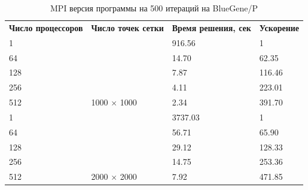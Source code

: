 \documentclass[12pt, a4paper]{article}
\begin{document}
        \begin{table}[H]
            \centering
            \caption{MPI версия программы на 500 итераций на BlueGene/P}
            \label{tab:bg_mpi500}
            \begin{tabular}{llll}
            \rowcolor[HTML]{C0C0C0}
            \textbf{Число процессоров} & \textbf{Число точек сетки}                   & \textbf{Время решения, сек} & \textbf{Ускорение} \\
            \rowcolor[HTML]{EFEFEF}
            1                          & \multicolumn{1}{c}{\cellcolor[HTML]{EFEFEF}} & 916.56                      & 1                  \\
            64                         &                                              & 14.70                       & 62.35              \\
            128                        &                                              & 7.87                        & 116.46             \\
            256                        &                                              & 4.11                        & 223.01             \\
            512                        & \multirow{-4}{*}{1000 $\times$ 1000}         & 2.34                        & 391.70             \\
            \rowcolor[HTML]{EFEFEF}
            1                          &                                              & 3737.03                     & 1                  \\
            64                         &                                              & 56.71                       & 65.90              \\
            128                        &                                              & 29.12                       & 128.33             \\
            256                        &                                              & 14.75                       & 253.36             \\
            512                        & \multirow{-4}{*}{2000 $\times$ 2000}         & 7.92                        & 471.85
            \end{tabular}
        \end{table}
\end{document}
